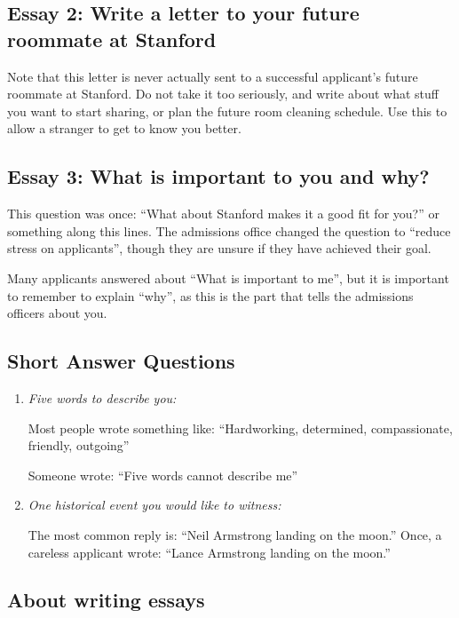 \documentclass[12pt]{article}
\begin{document}
\subsection{Essay 2: Write a letter to your future roommate at Stanford}

Note that this letter is never actually sent to a successful applicant's
future roommate at Stanford. Do not take it too seriously,
and write about what stuff you want to start sharing, or plan the future
room cleaning schedule. 
Use this to allow a stranger to get to know you better. 


\subsection{Essay 3: What is important to you and why?}

This question was once: ``What about Stanford makes it a good fit for you?''
or something along this lines.
The admissions office changed the question to ``reduce stress on applicants'',
though they are unsure if they have achieved their goal. 

Many applicants answered about ``What is important to me'', but
it is important to remember to explain ``why'',
as this is the part that tells the admissions officers about you. 

\subsection{Short Answer Questions}

\begin{enumerate}[(1)]
  \item \textit{Five words to describe you:}

	Most people wrote something like:
	``Hardworking, determined, compassionate, friendly, outgoing''
	
	Someone wrote: ``Five words cannot describe me''
  \item \textit{One historical event you would like to witness:}

	The most common reply is: ``Neil Armstrong landing on the moon.''
	Once, a careless applicant wrote: ``Lance Armstrong landing on the moon.''
\end{enumerate}

\subsection{About writing essays}
\end{document}

